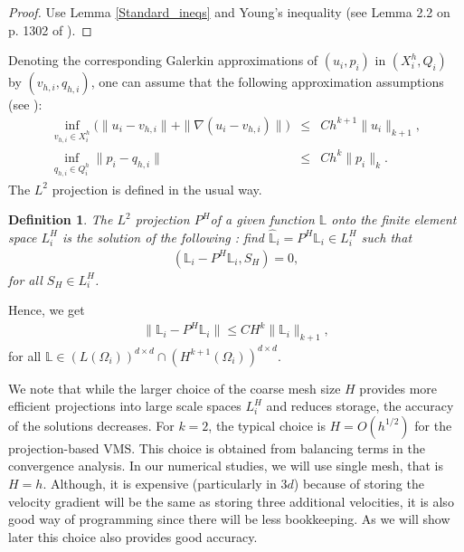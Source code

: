 \documentclass[10pt]{article}%
\numberwithin{equation}{section}
\newtheorem{definition}{Definition}[section]
\begin{document}
\begin{proof}
{ Use Lemma \ref{Standard_ineqs} and Young's inequality (see Lemma 2.2 on p. 1302 of \cite{CHL12}).}
\end{proof}
Denoting the corresponding Galerkin approximations of $(u_i,p_i)$ in $(X_i^h,Q_i)$ by $(v_{h,i},q_{h,i})$,  one can assume that the following approximation assumptions (see \cite{GR79}):
\begin{eqnarray}
\inf_{v_{h,i} \in X_i^h} \Big(\|u_i-v_{h,i}\|+\|\nabla(u_i-v_{h,i})\|\Big)&\leq& Ch^{k+1} \|u_i\|_{k+1},\label{inp2}\\\inf_{q_{h,i} \in Q_i^h} \|p_i-q_{h,i}\|&\leq& Ch^{k} \|p_i\|_{k}. \label{inp}
\end{eqnarray}
The  $L^2$ projection is defined in the usual way.
\begin{definition} \label{defpro}
The $L^2$ projection ${P}^H $of a given function $\mathbb{L}$ onto the finite element space $L_i^H$ is the solution of the following : find $\hat{\mathbb{L}}_i= {P}^H \mathbb{L}_i\in L_i^H$ such that
\begin{eqnarray} \label{pro}
(\mathbb{L}_i-{P}^H \mathbb{L}_i, S_H)=0,
\end{eqnarray}
for all $S_H \in L_i^H$.
\end{definition}
Hence, we get
\begin{eqnarray}\label{pro2}
	\|\mathbb{L}_i-{P}^H \mathbb{L}_i\| \leq CH^k\|\mathbb{L}_i\|_{k+1},
\end{eqnarray}
for all $\mathbb{L} \in (L(\Omega_i))^{d\times d}\cap (H^{k+1}(\Omega_i))^{d\times d}$.


We note that while the larger choice of the coarse mesh size $H$ provides more efficient projections into large scale spaces $L_i^H$ and reduces storage, the accuracy of the solutions decreases. For $k=2$, the typical choice is $H=O(h^{1/2})$ for the projection-based VMS. This choice is obtained from balancing terms in the convergence analysis. In our numerical studies, we will use single mesh, that is $H=h$. Although, it is expensive (particularly in $3d$) because of storing the velocity gradient will be the same as storing three additional velocities, it is also good way of programming since there will be less bookkeeping. As we will show later this choice also provides good accuracy.
\end{document}
